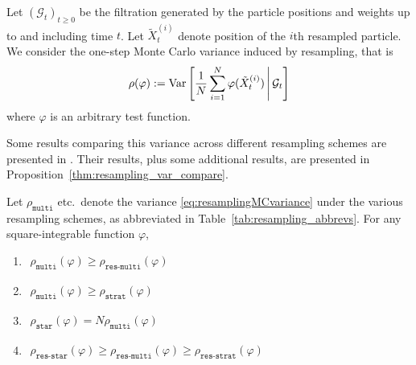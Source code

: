 Let $(\mathcal{G}_t)_{t\geq0}$ be the filtration generated by the particle positions and weights up to and including time $t$.
Let $\tilde{X}_t^{(i)}$ denote position of the $i$th resampled particle.
We consider the one-step Monte Carlo variance induced by resampling, that is
\begin{equation}\label{eq:resamplingMCvariance}
\rho(\varphi) 
:= \operatorname{Var}\left[ \frac{1}{N} \sum_{i=1}^N \varphi (\tilde{X}_t^{(i)}) \,\middle|\, \mathcal{G}_t \right]
\end{equation}
where $\varphi$ is an arbitrary test function.

Some results comparing this variance across different resampling schemes are presented in \textcite{douc2005}. 
Their results, plus some additional results, are presented in Proposition~\ref{thm:resampling_var_compare}.

\begin{prop}\label{thm:resampling_var_compare}
Let $\rho_{\texttt{multi}}$ etc.\ denote the variance \eqref{eq:resamplingMCvariance} under the various resampling schemes, as abbreviated in Table~\ref{tab:resampling_abbrevs}.
For any square-integrable function $\varphi$,
\begin{enumerate}[label=(\alph*)]
\item \label{item:resampling_var1} \hspace{5pt}
$\begin{aligned}
    \rho_{\texttt{multi}}(\varphi) 
    \geq \rho_{\texttt{res-multi}}(\varphi)
\end{aligned}$
\item \label{item:resampling_var2} \hspace{5pt}
$\begin{aligned}
    \rho_{\texttt{multi}}(\varphi) 
    \geq \rho_{\texttt{strat}}(\varphi)
\end{aligned}$
\item \label{item:resampling_var3} \hspace{5pt}
$\begin{aligned}
    \rho_{\texttt{star}}(\varphi) 
    = N \rho_{\texttt{multi}}(\varphi)
\end{aligned}$
\item \label{item:resampling_var4} \hspace{5pt}
$\begin{aligned}
    \rho_{\texttt{res-star}}(\varphi) 
    \geq \rho_{\texttt{res-multi}}(\varphi) 
    \geq \rho_{\texttt{res-strat}}(\varphi)
\end{aligned}$
\end{enumerate}
\end{prop}

